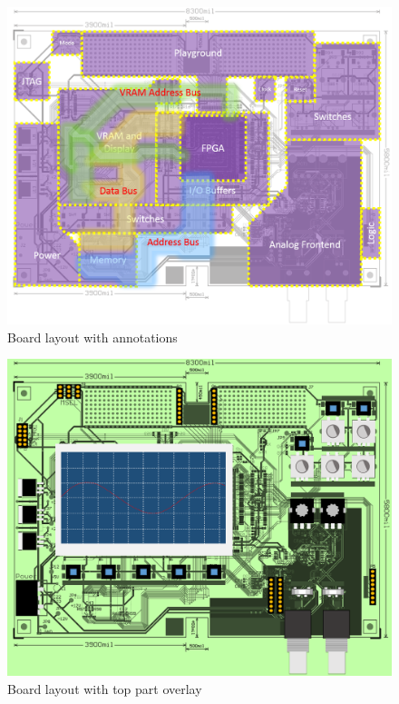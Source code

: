 \begin{figure}[ht!]
    \centering
    \includegraphics[width=6in]{circuit/board_annotated.png}
		\caption{Board layout with annotations}
\end{figure}

\begin{figure}[ht!]
    \centering
    \includegraphics[width=6in]{circuit/board_part_overlay.png}
		\caption{Board layout with top part overlay}
\end{figure}